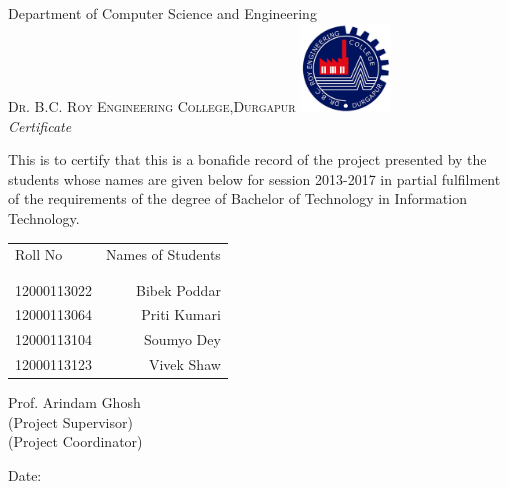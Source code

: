 \newpage
\thispagestyle{empty}

\begin{center}

\huge{Department of Computer Science and Engineering}\\[0.5cm]
\normalsize
\textsc{Dr. B.C. Roy Engineering College,Durgapur}
\vfill
\includegraphics[width=0.18\textwidth]{./logo}\\[0.1in]

\emph{\LARGE Certificate}\\[1cm]
\end{center}
\normalsize This is to certify that this is a bonafide record of the project presented by the students whose names are given below for session 2013-2017 in partial fulfilment of the requirements of the degree of Bachelor of Technology in Information Technology.\\[1.0cm]

\begin{table}[h]
\centering
\begin{tabular}{lr}
Roll No & Names of Students \\ \\ \hline
\\
12000113022 & Bibek Poddar \\
12000113064 & Priti Kumari  \\
12000113104 & Soumyo Dey \\ 
12000113123 & Vivek Shaw \\
\end{tabular}
\end{table}

\vfill


\begin{flushright}
Prof. Arindam Ghosh\\
(Project Supervisor)\\[1.5cm]
(Project Coordinator)\\
\end{flushright}

\begin{flushleft}
Date:
\end{flushleft}
